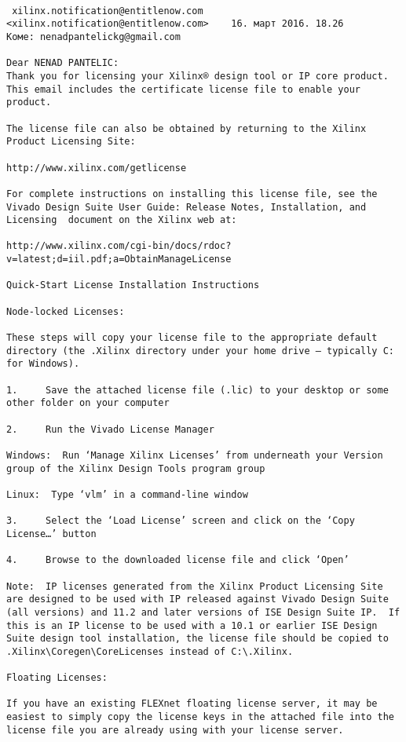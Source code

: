 \documentclass{article}
\begin{document}
\begin{verbatim}
 
 xilinx.notification@entitlenow.com <xilinx.notification@entitlenow.com>	16. март 2016. 18.26
Коме: nenadpantelickg@gmail.com

Dear NENAD PANTELIC:
Thank you for licensing your Xilinx® design tool or IP core product. This email includes the certificate license file to enable your product.

The license file can also be obtained by returning to the Xilinx Product Licensing Site: 

http://www.xilinx.com/getlicense

For complete instructions on installing this license file, see the  Vivado Design Suite User Guide: Release Notes, Installation, and Licensing  document on the Xilinx web at:          

http://www.xilinx.com/cgi-bin/docs/rdoc?v=latest;d=iil.pdf;a=ObtainManageLicense

Quick-Start License Installation Instructions

Node-locked Licenses:

These steps will copy your license file to the appropriate default directory (the .Xilinx directory under your home drive – typically C: for Windows).

1.     Save the attached license file (.lic) to your desktop or some other folder on your computer

2.     Run the Vivado License Manager

Windows:  Run ‘Manage Xilinx Licenses’ from underneath your Version group of the Xilinx Design Tools program group

Linux:  Type ‘vlm’ in a command-line window

3.     Select the ‘Load License’ screen and click on the ‘Copy License…’ button

4.     Browse to the downloaded license file and click ‘Open’ 

Note:  IP licenses generated from the Xilinx Product Licensing Site are designed to be used with IP released against Vivado Design Suite (all versions) and 11.2 and later versions of ISE Design Suite IP.  If this is an IP license to be used with a 10.1 or earlier ISE Design Suite design tool installation, the license file should be copied to .Xilinx\Coregen\CoreLicenses instead of C:\.Xilinx.

Floating Licenses:

If you have an existing FLEXnet floating license server, it may be easiest to simply copy the license keys in the attached file into the license file you are already using with your license server.


\end{verbatim}
\end{document}
